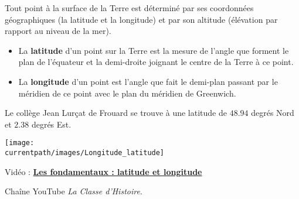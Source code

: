 \vspace*{-5mm} 

\vspace*{-5mm} 
\medskip

\begin{debat}
    Tout point à la surface de la Terre est déterminé par ses coordonnées géographiques (la latitude et la longitude) et par son altitude (élévation par rapport au niveau de la mer). \\
    \begin{minipage}{10.5cm}
       \begin{itemize}
          \item La {\bf latitude} d'un point sur la Terre est la mesure de l'angle que forment le plan de l'équateur et la demi-droite joignant le centre de la Terre à ce point.
          \item La {\bf longitude} d'un point est l'angle que fait le demi-plan passant par le méridien de ce point avec le plan du méridien de Greenwich.
       \end{itemize}
       Le collège Jean Lurçat de Frouard se trouve à une latitude de $\num{48.94}$ degrés Nord et $\num{2.38}$ degrés Est.
    \end{minipage}
    \hfill
    \begin{minipage}{5cm}
       \texttt{[image: \\currentpath/images/Longitude\_latitude]}
    \end{minipage} 
    \bigskip
    \begin{cadre}[B2][F4]
       \begin{center}
          Vidéo : \href{https://www.yout-ube.com/watch?v=lpYEuHeecko}{{\bf Les fondamentaux : latitude et longitude}}

          Chaîne YouTube {\it La Classe d'Histoire}.
       \end{center}
    \end{cadre}
\end{debat}